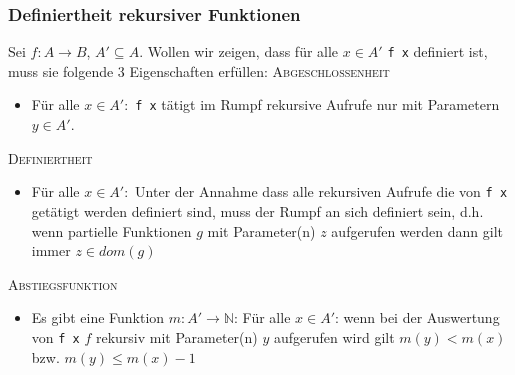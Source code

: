 \documentclass{beamer}
\begin{document}
\begin{frame}
  \frametitle{Definiertheit rekursiver Funktionen}
  Sei \(f:A\to B\), \(A'\subseteq A\). Wollen wir zeigen, dass für alle \(x\in A'\) \texttt{f x} definiert ist, muss sie folgende 3 Eigenschaften erfüllen:
  \textsc{Abgeschlossenheit}
  \begin{itemize}
  \item Für alle \(x\in A':\) \texttt{f x} tätigt im Rumpf rekursive Aufrufe nur mit Parametern \(y\in A'\).
  \end{itemize}
  \textsc{Definiertheit}
  \begin{itemize}
  \item Für alle \(x\in A':\) Unter der Annahme dass alle rekursiven Aufrufe die von \texttt{f x} getätigt werden definiert sind, muss der Rumpf an sich definiert sein, d.h. wenn partielle Funktionen \(g\) mit Parameter(n) \(z\) aufgerufen werden dann gilt immer \(z\in dom(g)\)
  \end{itemize}
  \textsc{Abstiegsfunktion}
  \begin{itemize}
  \item Es gibt eine Funktion \(m:A'\to \mathbb{N}\): Für alle \(x\in A'\): wenn bei der Auswertung von \texttt{f x} \(f\) rekursiv mit Parameter(n) \(y\) aufgerufen wird gilt \(m(y)<m(x)\) bzw. \(m(y)\leq m(x)-1\)
  \end{itemize}
\end{frame}
\end{document}
